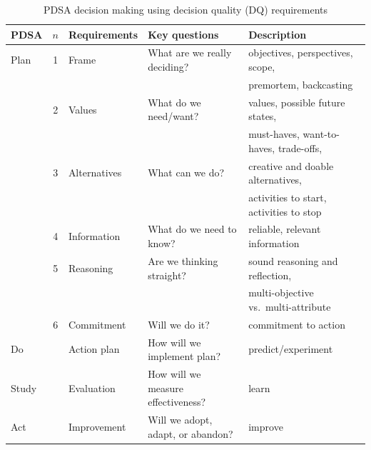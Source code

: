 \documentclass[landscape]{article}
\begin{document}
\begin{table}
  \centering
  \caption{PDSA decision making using decision quality (DQ) requirements}
\begin{tabular}{lclll}
\toprule
             PDSA&$n$&Requirements&Key questions&Description\\
\midrule
  Plan &1&Frame&What are we really deciding? &objectives,
                                               perspectives, scope,\\
  &&&&premortem, backcasting\\
       &2&Values&What do we need/want? &values, possible future
                                         states,\\
  &&&&must-haves, want-to-haves, trade-offs,\\
       &3&Alternatives&What can we do? &creative and doable
                                         alternatives,\\
  &&&&activities to start, activities to stop\\
       &4&Information&What do we need to know? &reliable, relevant information\\
       &5&Reasoning &Are we thinking straight? &sound reasoning and
                                                 reflection,\\
  &&&&multi-objective vs.\ multi-attribute\\
       &6&Commitment&Will we do it? &commitment to action\\
  Do   &&Action plan&How will we implement plan?&predict/experiment\\
  Study&&Evaluation&How will we measure effectiveness?&learn\\
  Act  &&Improvement&Will we adopt, adapt, or abandon?&improve\\
\bottomrule
\end{tabular}   
\end{table}




\bigskip
\end{document}
